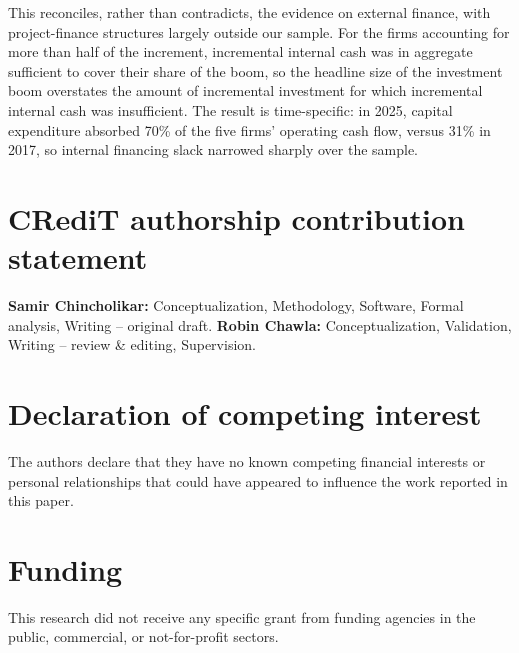 \documentclass[preprint,11pt]{elsarticle}
\begin{document}
This reconciles, rather than contradicts, the evidence on external finance, with project-finance
structures largely outside our sample. For the firms accounting for more than half of the increment,
incremental internal cash was in aggregate sufficient to cover their share of the boom, so the
headline size of the investment boom overstates the amount of incremental investment for which
incremental internal cash was insufficient. The result is time-specific: in 2025, capital
expenditure absorbed 70\% of the five firms' operating cash flow, versus 31\% in 2017, so internal
financing slack narrowed sharply over the sample.


\section*{CRediT authorship contribution statement}
\textbf{Samir Chincholikar:} Conceptualization, Methodology, Software, Formal analysis,
Writing -- original draft. \textbf{Robin Chawla:} Conceptualization, Validation, Writing --
review \& editing, Supervision.

\section*{Declaration of competing interest}
The authors declare that they have no known competing financial interests or personal
relationships that could have appeared to influence the work reported in this paper.

\section*{Funding}
This research did not receive any specific grant from funding agencies in the public,
commercial, or not-for-profit sectors.
\end{document}
